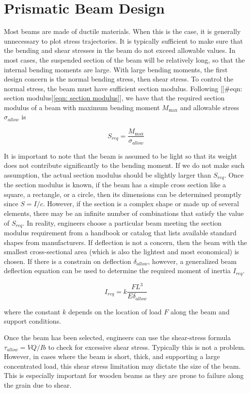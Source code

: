 \documentclass[a4paper,openany,12pt]{book}
\begin{document}
{{\section{Prismatic Beam Design}
\label{prismatic-beam-design}
Most beams are made of ductile materials. When this is the case, it is
generally unnecessary to plot stress trajectories. It is typically
sufficient to make sure that the bending and shear stresses in the beam
do not exceed allowable values. In most cases, the suspended section of
the beam will be relatively long, so that the internal bending moments
are large. With large bending moments, the first design concern is the
normal bending stress, then shear stress. To control the normal stress,
the beam must have sufficient section modulus. Following
[[\#eqn: section modulus]\ref{eqn: section modulus}], we have that the
required section modulus of a beam with maximum bending moment
\(M_{\max}\) and allowable stress \(\sigma_{allow}\) is

$$S_{req} = \frac{M_{\max}}{\sigma_{allow}}$$

It is important to note that the beam is assumed to be light so that its
weight does not contribute significantly to the bending moment. If we do
not make such assumption, the actual section modulus should be slightly
larger than \(S_{req}\). Once the section modulus is known, if the beam
has a simple cross section like a square, a rectangle, or a circle, then
its dimensions can be determined promptly since \(S = I/c\). However, if
the section is a complex shape or made up of several elements, there may
be an infinite number of combinations that satisfy the value of
\(S_{req}\). In reality, engineers choose a particular beam meeting the
section modulus requirement from a handbook or catalog that lists
available standard shapes from manufacturers. If deflection is not a
concern, then the beam with the smallest cross-sectional area (which is
also the lightest and most economical) is chosen. If there is a
constrain on deflection \(\delta_{allow}\), however, a generalized beam
deflection equation can be used to determine the required moment of
inertia \(I_{req}\).

$$I_{req} = k \frac{FL^3}{E \delta_{allow}}$$

where the constant \(k\) depends on the location of load \(F\) along the
beam and support conditions.

Once the beam has been selected, engineers can use the shear-stress
formula \(\tau_{allow} = VQ/Ib\) to check for excessive shear stress.
Typically this is not a problem. However, in cases where the beam is
short, thick, and supporting a large concentrated load, this shear
stress limitation may dictate the size of the beam. This is especially
important for wooden beams as they are prone to failure along the grain
due to shear.

}}
\end{document}
